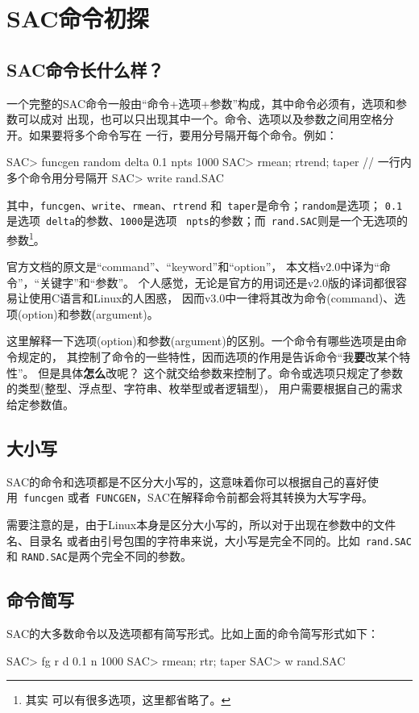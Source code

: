 \section{SAC命令初探}
\subsection{SAC命令长什么样？}
一个完整的SAC命令一般由``命令+选项+参数''构成，其中命令必须有，选项和参数可以成对
出现，也可以只出现其中一个。命令、选项以及参数之间用空格分开。如果要将多个命令写在
一行，要用分号隔开每个命令。例如：
\begin{SACCode}
SAC> funcgen random delta 0.1 npts 1000
SAC> rmean; rtrend; taper                 // 一行内多个命令用分号隔开
SAC> write rand.SAC
\end{SACCode}
其中，\verb+funcgen+、\verb+write+、\verb+rmean+、\verb+rtrend+
和~\verb+taper+是命令；\verb+random+是选项；
\verb+0.1+是选项~\verb+delta+的参数、\verb+1000+是选项
~\verb+npts+的参数；而~\verb+rand.SAC+则是一个无选项的参数\footnote{其实
可以有很多选项，这里都省略了。}。

\begin{Tips}
官方文档的原文是``command''、``keyword''和``option''，
本文档v2.0中译为``命令''，``关键字''和``参数''。
个人感觉，无论是官方的用词还是v2.0版的译词都很容易让使用C语言和Linux的人困惑，
因而v3.0中一律将其改为命令(command)、选项(option)和参数(argument)。

这里解释一下选项(option)和参数(argument)的区别。一个命令有哪些选项是由命令规定的，
其控制了命令的一些特性，因而选项的作用是告诉命令``我\textbf{要}改某个特性''。
但是具体\textbf{怎么}改呢？
这个就交给参数来控制了。命令或选项只规定了参数的类型(整型、浮点型、字符串、枚举型或者逻辑型)，
用户需要根据自己的需求给定参数值。
\end{Tips}

\subsection{大小写}
SAC的命令和选项都是不区分大小写的，这意味着你可以根据自己的喜好使用~\verb+funcgen+
或者~\verb+FUNCGEN+，SAC在解释命令前都会将其转换为大写字母。

需要注意的是，由于Linux本身是区分大小写的，所以对于出现在参数中的文件名、目录名
或者由引号包围的字符串来说，大小写是完全不同的。比如~\verb+rand.SAC+和
\verb+RAND.SAC+是两个完全不同的参数。

\subsection{命令简写}
SAC的大多数命令以及选项都有简写形式。比如上面的命令简写形式如下：
\begin{SACCode}
SAC> fg r d 0.1 n 1000
SAC> rmean; rtr; taper
SAC> w rand.SAC
\end{SACCode}

